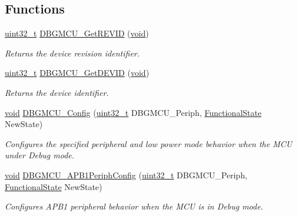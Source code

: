 \subsection*{Functions}
\begin{DoxyCompactItemize}
\item 
\hyperlink{stdint_8h_a435d1572bf3f880d55459d9805097f62}{uint32\-\_\-t} \hyperlink{group___d_b_g_m_c_u___private___functions_ga47419e9ca75ab7be4c70feb82faa0511}{D\-B\-G\-M\-C\-U\-\_\-\-Get\-R\-E\-V\-I\-D} (\hyperlink{group___n_a_m_e_ga18028b8badbf1ea7e704ccac3c488e82}{void})
\begin{DoxyCompactList}\small\item\em Returns the device revision identifier. \end{DoxyCompactList}\item 
\hyperlink{stdint_8h_a435d1572bf3f880d55459d9805097f62}{uint32\-\_\-t} \hyperlink{group___d_b_g_m_c_u___private___functions_gac34193c34dbce759bf424957a31b3266}{D\-B\-G\-M\-C\-U\-\_\-\-Get\-D\-E\-V\-I\-D} (\hyperlink{group___n_a_m_e_ga18028b8badbf1ea7e704ccac3c488e82}{void})
\begin{DoxyCompactList}\small\item\em Returns the device identifier. \end{DoxyCompactList}\item 
\hyperlink{group___n_a_m_e_ga18028b8badbf1ea7e704ccac3c488e82}{void} \hyperlink{group___d_b_g_m_c_u___private___functions_gadf2f267f855ac1e4c03905c5dcfbd28b}{D\-B\-G\-M\-C\-U\-\_\-\-Config} (\hyperlink{stdint_8h_a435d1572bf3f880d55459d9805097f62}{uint32\-\_\-t} D\-B\-G\-M\-C\-U\-\_\-\-Periph, \hyperlink{group___exported__types_gac9a7e9a35d2513ec15c3b537aaa4fba1}{Functional\-State} New\-State)
\begin{DoxyCompactList}\small\item\em Configures the specified peripheral and low power mode behavior when the M\-C\-U under Debug mode. \end{DoxyCompactList}\item 
\hyperlink{group___n_a_m_e_ga18028b8badbf1ea7e704ccac3c488e82}{void} \hyperlink{group___d_b_g_m_c_u___private___functions_ga71349f1435471f71979c742360df88f0}{D\-B\-G\-M\-C\-U\-\_\-\-A\-P\-B1\-Periph\-Config} (\hyperlink{stdint_8h_a435d1572bf3f880d55459d9805097f62}{uint32\-\_\-t} D\-B\-G\-M\-C\-U\-\_\-\-Periph, \hyperlink{group___exported__types_gac9a7e9a35d2513ec15c3b537aaa4fba1}{Functional\-State} New\-State)
\begin{DoxyCompactList}\small\item\em Configures A\-P\-B1 peripheral behavior when the M\-C\-U is in Debug mode. \end{DoxyCompactList}\item 

\end{DoxyCompactItemize}
